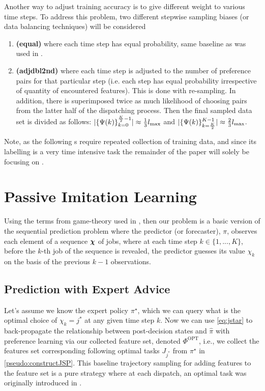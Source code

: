 \documentclass[smallextended]{svjour3}
\begin{document}
Another way to adjust training accuracy is to give different weight to various 
time steps. To address this problem, two different stepwise sampling biases (or 
data balancing techniques) will be considered
\begin{enumerate}[after={{}}, leftmargin=*,
  label={\textbf{Bias.\arabic*}}, ref={{Bias.\arabic*}}]
  \item \label{bias:equal} \textbf{(equal)} where each time step has equal 
  probability, same baseline as was used in \cite{InRu14,InRu15a}.
  \item \label{bias:adjdbl2nd} \textbf{(adjdbl2nd)} where each time step is 
  adjusted to the number of preference pairs for that particular step (i.e. 
  each step has equal probability irrespective of quantity of encountered 
  features). This is done with re-sampling.
  In addition, there is superimposed twice as much likelihood of 
  choosing pairs from the latter half of the dispatching process. Then the 
  final sampled data set is divided as follows:
  $\lvert\{\Psi(k)\}_{k=0}^{\frac{K}{2}-1}\rvert \approx \frac{1}{3}l_{\max}$ and 
  $\lvert\{\Psi(k)\}_{k=\frac{K}{2}}^{K-1}\rvert \approx \frac{2}{3}l_{\max}$.
\end{enumerate}

Note, as the following s require repeated collection 
of training data, and since its labelling is a very time intensive task the 
remainder of the paper will solely be focusing on .

\section{Passive Imitation Learning}\label{sec:il:passive}
Using the terms from game-theory used in \cite{CesaBianchi06}, %
then our problem is a basic version of the sequential prediction problem where 
the predictor (or forecaster), $\pi$, observes each element of a sequence 
$\bm \chi$ of jobs, where at each time step $k \in \{1,...,K\}$, before the 
$k$-th job of the sequence is revealed, the predictor guesses its value 
$\chi_k$ on the basis of the previous $k-1$ observations. 

\subsection{Prediction with Expert Advice}\label{sec:expertPolicy}
Let's assume we know the expert policy $\pi^\star$, which we can query what 
is the optimal choice of $\chi_k={j^*}$ at any given time step $k$. 
Now we can use \cref{eq:jstar} to back-propagate the relationship between 
post-decision states and $\hat{\pi}$ with preference learning via our collected 
feature set, denoted $\Phi^\text{OPT}$, i.e., we collect the features set 
corresponding following optimal tasks $J_{j^*}$ from $\pi^\star$ in 
\cref{pseudo:constructJSP}.
This baseline trajectory sampling for adding features to the feature set 
is a pure strategy where at each dispatch, an optimal task was originally 
introduced in \cite{InRu11a}.
\end{document}
